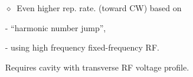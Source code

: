 \documentclass[12pt]{article}
\newcommand{\nid}{\noindent \ensuremath{\diamond~}}
\newcommand{\black}{\color{black}}
\begin{document}
{\begin{minipage}{0.59\linewidth}
\begin{itemize}
- repetition rate $>$100~Hz, 


\black

\item[\nid] Even higher rep. rate. (toward CW)  based on

 - ``harmonic number jump'', 

-  using high frequency fixed-frequency RF.

 Requires cavity with transverse RF voltage profile.  

\black
\end{itemize}

~

~

\end{minipage} 
}






\end{document}
